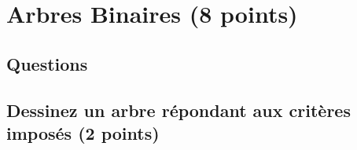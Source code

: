 \documentclass[11pt,a4paper]{article}
\begin{document}


\vspace*{-0.75cm}


\section{Arbres Binaires (8 points)}

\subsection*{Questions}


\subsection{Dessinez un arbre répondant aux critères imposés (2 points) }

%
\end{document}
